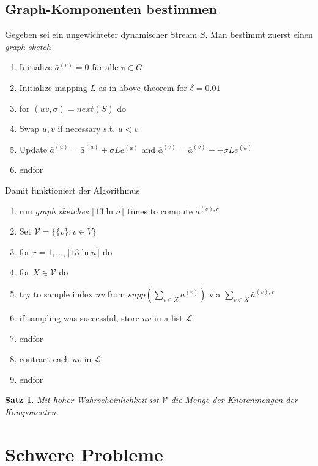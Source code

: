 \documentclass[a4paper, 12pt]{article}
\theoremstyle{plain}
\newtheorem{theorem}{Satz}[subsection] %
\theoremstyle{definition}
\theoremstyle{lemma}
\theoremstyle{remark}
\theoremstyle{corollary}
\theoremstyle{example}
\begin{document}
	\subsection{Graph-Komponenten bestimmen}
	Gegeben sei ein ungewichteter dynamischer Stream $S$. Man bestimmt zuerst einen \textit{graph sketch}
	\begin{enumerate}
		\item Initialize $\bar a^{(v)} = 0$ für alle $v \in G$
		\item Initialize mapping $L$ as in above theorem for $\delta = 0.01$
		\item for $(uv,\sigma) = next(S)$ do
		\item Swap $u,v$ if necessary s.t. $u<v$
		\item Update $\bar a^{(u)} = \bar a^{(u)} + \sigma Le^{(u)}$ and $\bar a^{(v)} = \bar a^{(v)} - - \sigma Le^{(u)}$
		\item endfor
	\end{enumerate}
	Damit funktioniert der Algorithmus \begin{enumerate}
		\item run \textit{graph sketches} $\lceil13 \ln n\rceil$ times to compute $\bar a^{(v),r}$
		\item Set $\mathcal{V} = \{\{v\}: v \in V\}$
		\item for $r=1,...,\lceil13 \ln n\rceil$ do
		\item for $X \in \mathcal{V}$ do
		\item try to sample index $uv$ from $supp(\sum_{v \in X} a^{(v)})$ via $\sum_{v \in X} \bar a^{(v),r}$
		\item if sampling was successful, store $uv$ in a list $\mathcal{L}$
		\item endfor
		\item contract each $uv$ in $\mathcal{L}$
		\item endfor
	\end{enumerate}
	\begin{theorem}
		Mit hoher Wahrscheinlichkeit ist $\mathcal{V}$ die Menge der Knotenmengen der Komponenten.
	\end{theorem}
	\section{Schwere Probleme}
\end{document}
